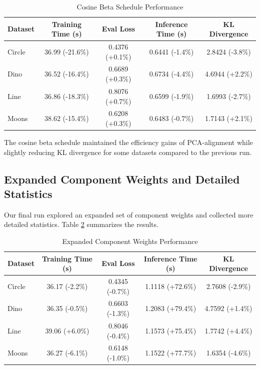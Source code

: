 \documentclass{article} %
\begin{document}
\begin{table}[h]
\centering
\caption{Cosine Beta Schedule Performance}
\label{tab:cosine_schedule}
\begin{tabular}{lcccc}
\hline
Dataset & Training Time (s) & Eval Loss & Inference Time (s) & KL Divergence \\
\hline
Circle & 36.99 (-21.6\%) & 0.4376 (+0.1\%) & 0.6441 (-1.4\%) & 2.8424 (-3.8\%) \\
Dino & 36.52 (-16.4\%) & 0.6689 (+0.3\%) & 0.6734 (-4.4\%) & 4.6944 (+2.2\%) \\
Line & 36.86 (-18.3\%) & 0.8076 (+0.7\%) & 0.6599 (-1.9\%) & 1.6993 (-2.7\%) \\
Moons & 38.62 (-15.4\%) & 0.6208 (+0.3\%) & 0.6483 (-0.7\%) & 1.7143 (+2.1\%) \\
\hline
\end{tabular}
\end{table}

The cosine beta schedule maintained the efficiency gains of PCA-alignment while slightly reducing KL divergence for some datasets compared to the previous run.

\subsection{Expanded Component Weights and Detailed Statistics}
Our final run explored an expanded set of component weights and collected more detailed statistics. Table \ref{tab:expanded_weights} summarizes the results.

\begin{table}[h]
\centering
\caption{Expanded Component Weights Performance}
\label{tab:expanded_weights}
\begin{tabular}{lcccc}
\toprule
Dataset & Training Time (s) & Eval Loss & Inference Time (s) & KL Divergence \\
\midrule
Circle & 36.17 (-2.2\%) & 0.4345 (-0.7\%) & 1.1118 (+72.6\%) & 2.7608 (-2.9\%) \\
Dino & 36.35 (-0.5\%) & 0.6603 (-1.3\%) & 1.2083 (+79.4\%) & 4.7592 (+1.4\%) \\
Line & 39.06 (+6.0\%) & 0.8046 (-0.4\%) & 1.1573 (+75.4\%) & 1.7742 (+4.4\%) \\
Moons & 36.27 (-6.1\%) & 0.6148 (-1.0\%) & 1.1522 (+77.7\%) & 1.6354 (-4.6\%) \\
\bottomrule
\end{tabular}
\end{table}
\end{document}
